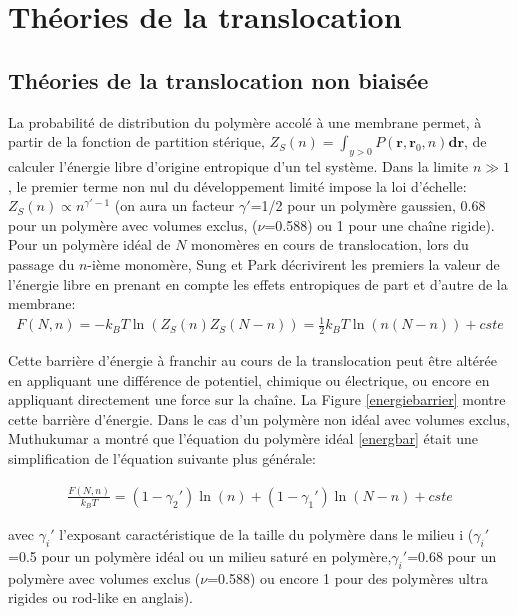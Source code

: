 \section{Théories de la translocation}

\subsection{Théories de la translocation non biaisée}


La probabilité de distribution du polymère accolé à une membrane permet, à partir de la fonction de partition stérique, $Z_S(n)= \int_{y>0} P(\textbf{r},\textbf{r}_0,n) \textbf{dr}$, de calculer l'énergie libre d'origine entropique d'un tel système. Dans la limite $n \gg 1$, le premier terme non nul du développement limité impose la loi d'échelle: $Z_S(n) \propto n^{\gamma'-1}$ (on aura un facteur $\gamma'$=1/2 pour un polymère gaussien, 0.68 pour un polymère avec volumes exclus,  ($\nu$=0.588) ou 1 pour une chaîne rigide). Pour un polymère idéal de $N$ monomères en cours de translocation, lors du passage du $n$-ième monomère, Sung et Park \cite{Sung1996} décrivirent les premiers la valeur de l'énergie libre en prenant en compte les effets entropiques de part et d'autre de la membrane:
\begin{eqnarray}
F(N,n)= -k_BT\ln\left(Z_S(n)Z_S(N-n)\right)= \frac{1}{2} k_BT \ln \left(n(N-n)\right) +cste
\label{energbar}
\end{eqnarray}

Cette barrière d'énergie à franchir au cours de la translocation peut être altérée en appliquant une différence de potentiel, chimique ou électrique, ou encore en appliquant directement une force sur la chaîne. La Figure \ref{energiebarrier} montre cette barrière d'énergie.
 Dans le cas d'un polymère non idéal avec volumes exclus, Muthukumar \cite{Muthukumar1999} a montré que l'équation du polymère idéal \ref{energbar} était une simplification de l'équation suivante plus générale:

\begin{eqnarray}
\frac{F(N,n)}{k_BT}= (1-\gamma_2')\ln(n)+ (1-\gamma_1')\ln(N-n)+cste
\label{energbarsaw}
\end{eqnarray}

avec $\gamma_i'$ l'exposant caractéristique de la taille du polymère dans le milieu i ($\gamma_i'$=0.5 pour un polymère idéal ou un milieu saturé en polymère,$\gamma_i'$=0.68  pour un polymère avec volumes exclus ($\nu$=0.588) ou encore 1 pour des polymères ultra rigides ou rod-like en anglais).

